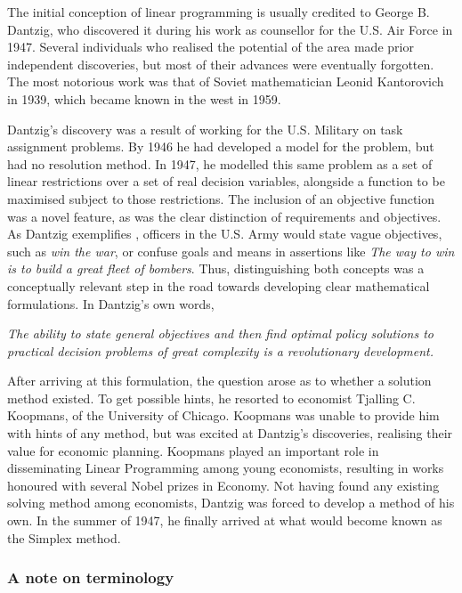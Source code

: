 The initial conception of linear programming is usually credited to George B.
Dantzig, who discovered it during his work as counsellor for the U.S. Air Force
in 1947. Several individuals who realised the potential of the area made prior
independent discoveries, but most of their advances were eventually forgotten.
The most notorious work was that of Soviet mathematician Leonid Kantorovich in
1939, which became known in the west in 1959.

Dantzig's discovery was a result of working for the U.S. Military on task
assignment problems. By 1946 he had developed a model for the problem, but had
no resolution method. In 1947, he modelled this same problem as a set of linear
restrictions over a set of real decision variables, alongside a function to be
maximised subject to those restrictions. The inclusion of an objective function
was a novel feature, as was the clear distinction of requirements and
objectives. As Dantzig exemplifies \cite{da:reminiscences}, officers in the U.S.
Army would state vague objectives, such as \emph{win the war}, or confuse goals
and means in assertions like \emph{The way to win is to build a great fleet of
bombers}. Thus, distinguishing both concepts was a conceptually relevant step in
the road towards developing clear mathematical formulations. In Dantzig's own
words,

\begin{flushright}
   \textit{ 
        The ability to state general objectives and then find optimal policy
	solutions to practical decision problems of great complexity is a
	revolutionary development.
   }
\end{flushright}

After arriving at this formulation, the question arose as to whether a solution
method existed. To get possible hints, he resorted to economist Tjalling C.
Koopmans, of the University of Chicago. Koopmans was unable to provide him with
hints of any method, but was excited at Dantzig's discoveries, realising their
value for economic planning. Koopmans played an important role in disseminating
Linear Programming among young economists, resulting in works honoured with
several Nobel prizes in Economy. Not having found any existing solving method
among economists, Dantzig was forced to develop a method of his own. In the
summer of 1947, he finally arrived at what would become known as the Simplex
method.

\subsubsection{A note on terminology} %

